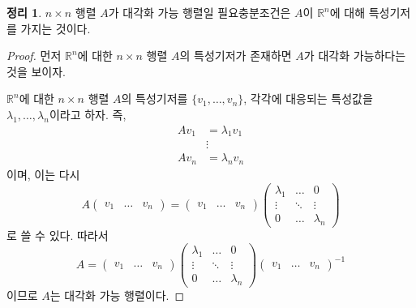\documentclass[unfonts,oneside,a4paper]{oblivoir}
\theoremstyle{definition}
\theoremstyle{theorem}
\newtheorem{theorem}{정리}[section]
\theoremstyle{theorem}
\theoremstyle{remark}
\theoremstyle{remark}
\theoremstyle{remark}
\theoremstyle{remark}
\renewcommand{\vec}[1]{\bm{\mathit{#1}}}
\begin{document}
\begin{theorem}
    $n \times n$ 행렬 $A$가 대각화 가능 행렬일 필요충분조건은 $A$이 $\mathbb R^n$에 대해 특성기저를 가지는 것이다.
\end{theorem}

\begin{proof}
    먼저 $\mathbb R^n$에 대한 $n \times n$ 행렬 $A$의 특성기저가 존재하면 $A$가 대각화 가능하다는 것을 보이자.

    $\mathbb R^n$에 대한 $n \times n$ 행렬 $A$의 특성기저를 $\{\vec v_1, \dots, \vec v_n\}$, 각각에 대응되는 특성값을 $\lambda_1, \dots, \lambda_n$이라고 하자.
    즉,
    \begin{align*}
        A\vec v_1 &= \lambda_1 \vec v_1\\
                  &\vdots\\
        A\vec v_n &= \lambda_n \vec v_n
    \end{align*}
    이며, 이는 다시
    \begin{equation*}
        A
        \begin{pmatrix}
            \vec v_1 & \dots & \vec v_n
        \end{pmatrix}
        =
        \begin{pmatrix}
            \vec v_1 & \dots & \vec v_n
        \end{pmatrix}
        \begin{pmatrix}
            \lambda_1 & \dots & 0\\
            \vdots & \ddots & \vdots\\
            0 & \dots & \lambda_n
        \end{pmatrix}
    \end{equation*}
    로 쓸 수 있다.
    따라서
    \begin{equation*}
        A
        =
        \begin{pmatrix}
            \vec v_1 & \dots & \vec v_n
        \end{pmatrix}
        \begin{pmatrix}
            \lambda_1 & \dots & 0\\
            \vdots & \ddots & \vdots\\
            0 & \dots & \lambda_n
        \end{pmatrix}
        \begin{pmatrix}
            \vec v_1 & \dots & \vec v_n
        \end{pmatrix}^{-1}
    \end{equation*}
    이므로 $A$는 대각화 가능 행렬이다.


\end{proof}
\end{document}
